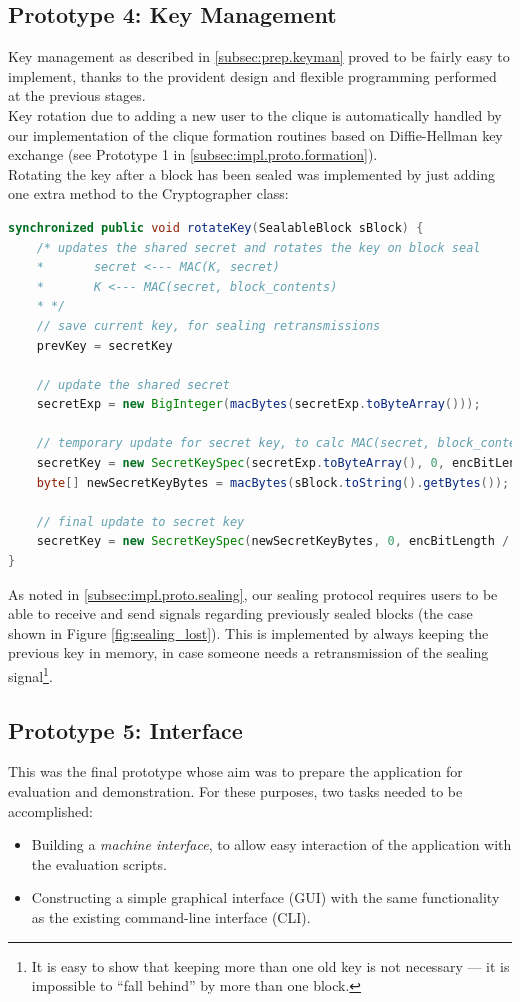 \documentclass[a4paper, 12pt]{report}
\begin{document}
\subsection{Prototype 4: Key Management}
Key management as described in \cref{subsec:prep.keyman} proved to be fairly easy to implement, thanks to the provident design and flexible programming performed at the previous stages. \\

Key rotation due to adding a new user to the clique is automatically handled by our implementation of the clique formation routines based on Diffie-Hellman key exchange (see Prototype 1 in \cref{subsec:impl.proto.formation}). \\

Rotating the key after a block has been sealed was implemented by just adding one extra method to the Cryptographer class:

\begin{lstlisting}[language=Java, columns=fullflexible]
synchronized public void rotateKey(SealableBlock sBlock) {
    /* updates the shared secret and rotates the key on block seal
    *       secret <--- MAC(K, secret)
    *       K <--- MAC(secret, block_contents)
    * */ 
    // save current key, for sealing retransmissions
    prevKey = secretKey
    
    // update the shared secret
    secretExp = new BigInteger(macBytes(secretExp.toByteArray()));

    // temporary update for secret key, to calc MAC(secret, block_content)
    secretKey = new SecretKeySpec(secretExp.toByteArray(), 0, encBitLength / 8, encAlgo);
    byte[] newSecretKeyBytes = macBytes(sBlock.toString().getBytes());

    // final update to secret key
    secretKey = new SecretKeySpec(newSecretKeyBytes, 0, encBitLength / 8, encAlgo);
}
\end{lstlisting}
As noted in \cref{subsec:impl.proto.sealing}, our sealing protocol requires users to be able to receive and send signals regarding previously sealed blocks (the case shown in Figure \ref{fig:sealing_lost}). This is implemented by always keeping the previous key in memory, in case someone needs a retransmission of the sealing signal\footnote{It is easy to show that keeping more than one old key is not necessary --- it is impossible to ``fall behind'' by more than one block.}.

\subsection{Prototype 5: Interface}
This was the final prototype whose aim was to prepare the application for evaluation and demonstration. For these purposes, two tasks needed to be accomplished:
\begin{itemize}
    \item Building a \emph{machine interface}, to allow easy interaction of the application with the evaluation scripts.
    \item Constructing a simple graphical interface (GUI) with the same functionality as the existing command-line interface (CLI).
\end{itemize}
\end{document}
